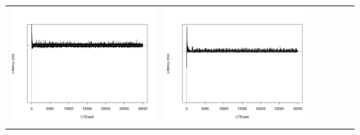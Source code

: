 \begin{table}[htbp]
{\begin{tabular}{l | ccccc}
\begin{minipage}{.15\textwidth}
     			 	\includegraphics[width=\linewidth]{images/lat-log-triple/I9}
    				 \end{minipage}
    			   &	 \begin{minipage}{.15\textwidth}\vspace{2pt}     							
     			 	\includegraphics[width=\linewidth]{images/lat-log-triple/I12}
    				 \end{minipage}
    			   &	 \begin{minipage}{.15\textwidth}\vspace{2pt}     							

\end{minipage}
\end{tabular}}
\end{table}
